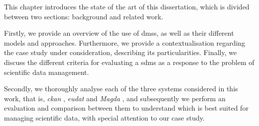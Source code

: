 \label{ref:chapter_2}

This chapter introduces the state of the art of this dissertation, which is divided between two sections: background and related work.

Firstly, we provide an overview of the use of \gls{dms}s, as well as their different models and approaches. Furthermore, we provide a contextualisation regarding the case study under consideration, describing its particularities. Finally, we discuss the different criteria for evaluating a \gls{sdms} as a response to the problem of scientific data management.

Secondly, we thoroughly analyse each of the three systems considered in this work, that is, \textit{\gls{ckan}} \citep{ckn}, \textit{\gls{eudat}} \citep{eud} and \textit{Magda} \citep{mgd}, and subsequently we perform an evaluation and comparison between them to understand which is best suited for managing scientific data, with special attention to our case study.